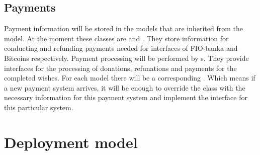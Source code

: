 

\subsection{Payments}
Payment information will be stored in the models that are inherited from the  model. At the moment these
classes are  and . They store information for conducting and refunding
payments needed for interfaces of FIO-banka and Bitcoins respectively. Payment processing will be performed by
s. They provide interfaces for the processing of donations, refunations and payments for the
completed wishes. For each  model there will be a corresponding . Which means if
a new payment system arrives, it will be enough to override the  class with the necessary information
for this payment system and implement the  interface for this particular system.


\section{Deployment model}
